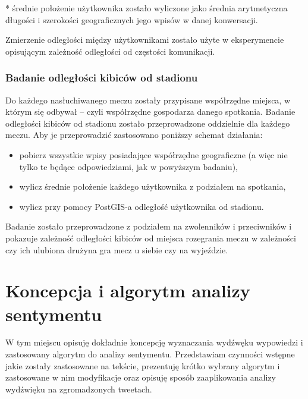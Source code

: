 * średnie położenie użytkownika zostało wyliczone jako średnia arytmetyczna
długości i szerokości geograficznych jego wpisów w danej konwersacji.

Zmierzenie odległości między użytkownikami zostało użyte w eksperymencie
opisującym zależność odległości od częstości komunikacji.



\subsubsection{Badanie odległości kibiców od stadionu}
\label{subsubsection:badanieodleglosciodstadionu}
Do każdego nasłuchiwanego meczu zostały przypisane współrzędne miejsca, w którym
się odbywał -- czyli współrzędne gospodarza danego spotkania. Badanie odległości
kibiców od stadionu zostało przeprowadzone oddzielnie dla każdego meczu. Aby je
przeprowadzić zastosowano poniższy schemat działania:

\begin{itemize}
  \item pobierz wszystkie wpisy posiadające współrzędne geograficzne (a więc
  nie tylko te będące odpowiedziami, jak w powyższym badaniu),
  \item wylicz średnie położenie każdego użytkownika z podziałem na spotkania,
  \item wylicz przy pomocy PostGIS-a odległość użytkownika od stadionu.
\end{itemize}

Badanie zostało przeprowadzone z podziałem na zwolenników i przeciwników i
pokazuje zależność odległości kibiców od miejsca rozegrania meczu w zależności
czy ich ulubiona drużyna gra mecz u siebie czy na wyjeździe.










\section{Koncepcja i algorytm analizy sentymentu}
\label{section:koncepcjaialgorytmanalizysentymentu}

W tym miejscu opisuję dokładnie koncepcję wyznaczania wydźwęku wypowiedzi i
zastosowany algorytm do analizy sentymentu. Przedstawiam czynności wstępne jakie
zostały zastosowane na tekście, prezentuję krótko wybrany algorytm i zastosowane
w nim modyfikacje oraz opisuję sposób zaaplikowania analizy wydźwięku na
zgromadzonych tweetach.

